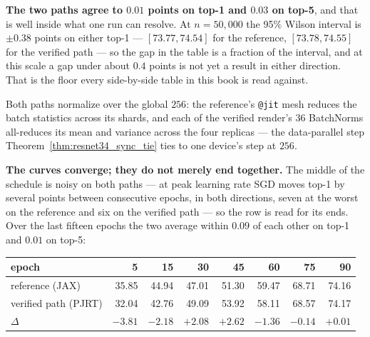 \medskip\noindent\textbf{The two paths agree to $0.01$ points on top-1 and
$0.03$ on top-5}, and that is well inside what one run can resolve. At $n = 50{,}000$ the 95\% Wilson interval is $\pm0.38$ points on either top-1
--- $[73.77, 74.54]$ for the reference, $[73.78, 74.55]$ for the verified
path --- so the gap in the table is a fraction of the interval, and
at this scale a gap under about $0.4$ points is not yet a result in either
direction. That is the floor every side-by-side table in this book is read
against.

\medskip\noindent Both paths normalize over the global $256$: the
reference's \texttt{@jit} mesh reduces the batch statistics across its
shards, and each of the verified render's 36 BatchNorms all-reduces its
mean and variance across the four replicas --- the data-parallel step
Theorem~\ref{thm:resnet34_sync_tie} ties to one device's step at $256$.

\medskip\noindent\textbf{The curves converge; they do not merely end
together.} The middle of the schedule is noisy on both paths --- at peak
learning rate SGD moves top-1 by several points between consecutive
epochs, in both directions, seven at the worst on the reference and six on
the verified path --- so the row is read for its ends. Over the last fifteen
epochs the two average within $0.09$ of each other on top-1 and $0.01$ on
top-5:

\begin{center}
\begin{tabular}{@{}l r r r r r r r@{}}
\hline
epoch & 5 & 15 & 30 & 45 & 60 & 75 & 90 \\
\hline
reference (JAX)       & 35.85 & 44.94 & 47.01 & 51.30 & 59.47 & 68.71 & 74.16 \\
verified path (PJRT)  & 32.04 & 42.76 & 49.09 & 53.92 & 58.11 & 68.57 & 74.17 \\
$\Delta$              & $-3.81$ & $-2.18$ & $+2.08$ & $+2.62$ & $-1.36$ & $-0.14$ & $+0.01$ \\
\hline
\end{tabular}
\end{center}

